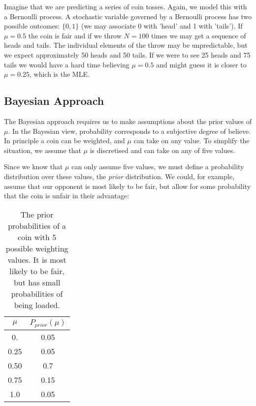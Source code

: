 Imagine that we are predicting a series of coin tosses. Again, we model this with a Bernoulli process. A stochastic variable governed by a Bernoulli process has two possible outcomes: $\{ 0, 1 \}$ (we may associate 0 with 'head' and 1 with 'tails'). 
If $\mu = 0.5$ the coin is fair and if we throw $N=100$ times we may get a sequence of heads and tails. The individual elements of the throw may be unpredictable, but we expect approximately 50 heads and 50 tails.
If we were to see 25 heads and 75 tails we would have a hard time believing $\mu = 0.5$ and might guess it is closer to $\mu = 0.25$, which is the MLE.



\subsection{Bayesian Approach}
\label{sec-bayesexample}
The Bayesian approach requires us to make assumptions about the prior values of $\mu$. In the Bayesian view, probability corresponds to a subjective degree of believe.
In principle a coin can be weighted, and $\mu$ can take on any value. To simplify the situation, we assume that $\mu$ is discretised and can take on any of five values.

Since we know that $\mu$ can only assume five values, we must define a probability distribution over these values, the \emph{prior} distribution.
We could, for example,
assume that our opponent is most likely to be fair, but allow for some probability that the coin is unfair
in their advantage:


\begin{table}[!ht]
  \begin{center}
  \begin{tabular}{||c|c||}  \hline
    $\mu$ & $P_{prior}(\mu)$  \\ \hline  
    0.    &  0.05   \nonumber \\ 
    0.25  &  0.05   \nonumber \\
    0.50  &  0.7    \nonumber \\
    0.75  &  0.15   \nonumber \\
    1.0   &  0.05 \\ \hline
  \end{tabular}
  \end{center}
  \caption{The prior probabilities of a coin with 5 possible weighting values. It is most likely to be fair, but has small probabilities of being loaded.}
\end{table}


